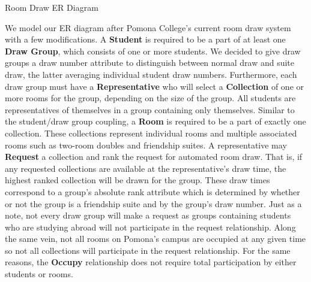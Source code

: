 \documentclass{article}
\begin{document}
\begin{center} \Large Room Draw ER Diagram \end{center}

We model our ER diagram after Pomona College's current room draw system with a few modifications. A \textbf{Student} is required to be a part of at least one \textbf{Draw Group}, which consists of one or more students. We decided to give draw groups a draw number attribute to distinguish between normal draw and suite draw, the latter averaging individual student draw numbers. Furthermore, each draw group must have a \textbf{Representative} who will select a \textbf{Collection} of one or more rooms for the group, depending on the size of the group. All students are representatives of themselves in a group containing only themselves. Similar to the student/draw group coupling, a \textbf{Room} is required to be a part of exactly one collection. These collections represent individual rooms and multiple associated rooms such as two-room doubles and friendship suites. A representative may \textbf{Request} a collection and rank the request for automated room draw. That is, if any requested collections are available at the representative's draw time, the highest ranked collection will be drawn for the group. These draw times correspond to a group's absolute rank attribute which is determined by whether or not the group is a friendship suite and by the group's draw number. Just as a note, not every draw group will make a request as groups containing students who are studying abroad will not participate in the request relationship. Along the same vein, not all rooms on Pomona's campus are occupied at any given time so not all collections will participate in the request relationship. For the same reasons, the \textbf{Occupy} relationship does not require total participation by either students or rooms. 
\end{document}

